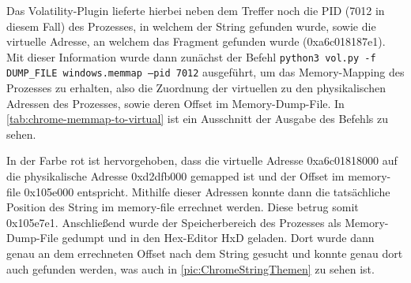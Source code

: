 Das Volatility-Plugin lieferte hierbei neben dem Treffer noch die PID (7012 in diesem Fall) des Prozesses, in welchem der String gefunden wurde, sowie die virtuelle Adresse, an welchem das Fragment gefunden wurde (0xa6c018187e1). Mit dieser Information wurde dann zunächst der Befehl \texttt{python3 vol.py -f DUMP\_FILE windows.memmap --pid 7012} ausgeführt, um das Memory-Mapping des Prozesses zu erhalten, also die Zuordnung der virtuellen zu den physikalischen Adressen des Prozesses, sowie deren Offset im Memory-Dump-File. In \autoref{tab:chrome-memmap-to-virtual} ist ein Ausschnitt der Ausgabe des Befehls zu sehen.

\begin{table}[h!]
	\centering
	\caption{Chrome: Abbildung virtueller Adressen auf Byte-Offsets der Speicherseite}
	\label{tab:chrome-memmap-to-virtual}
\end{table}

In der Farbe rot ist hervorgehoben, dass die virtuelle Adresse 0xa6c01818000 auf die physikalische Adresse 0xd2dfb000 gemapped ist und der Offset im memory-file 0x105e000 entspricht. Mithilfe dieser Adressen konnte dann die tatsächliche Position des String im memory-file errechnet werden. Diese betrug somit 0x105e7e1. Anschließend wurde der Speicherbereich des Prozesses als Memory-Dump-File gedumpt und in den Hex-Editor HxD geladen. Dort wurde dann genau an dem errechneten Offset nach dem String gesucht und konnte genau dort auch gefunden werden, was auch in \autoref{pic:ChromeStringThemen} zu sehen ist.

